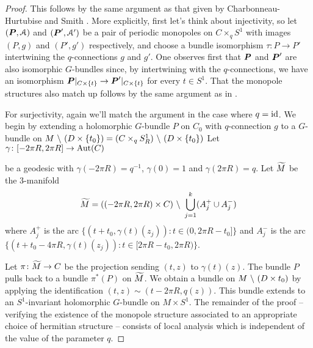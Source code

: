 \documentclass[10pt, oneside]{article}
\begin{document}
\begin{proof}
This follows by the same argument as that given by Charbonneau-Hurtubise \cite{CharbonneauHurtubise} and Smith \cite{Smith}.  More explicitly, first let's think about injectivity, so let $(\boldsymbol{P}, \mathcal{A})$ and $(\boldsymbol{P}', \mathcal{A}')$ be a pair of periodic monopoles on $C \times_q S^1$ with images $(P,g)$ and $(P', g')$ respectively, and choose a bundle isomorphism $\tau \colon P \to P'$ intertwining the $q$-connections $g$ and $g'$.  One observes first that $\boldsymbol{P}$ and $\boldsymbol{P}'$ are also isomorphic $G$-bundles since, by intertwining with the $q$-connections, we have an isomorphism $\boldsymbol{P}|_{C \times \{t\}} \to \boldsymbol{P}'|_{C \times \{t\}}$ for every $t \in S^1$.  That the monopole structures also match up follows by the same argument as in \cite[Proposition 4.7]{CharbonneauHurtubise}.

For surjectivity, again we'll match the argument in the case where $q=\operatorname{id}$.  We begin by extending a holomorphic $G$-bundle $P$ on $C_0$ with $q$-connection $g$ to a $G$-bundle on $M \ \backslash \  (D \times \{t_0\}) = (C \times_q S^1_R) \ \backslash \  (D \times \{t_0\})$  Let $\gamma \colon [-2\pi R,2\pi R] \to \operatorname{Aut}(C)$ 
 

be a geodesic with $\gamma(-2\pi R) = q^{-1}$, $\gamma(0)=1$ and $\gamma(2\pi R) = q$.  Let $\widetilde{M}$ be the 3-manifold
\[\widetilde{M} = ((-2\pi R, 2\pi R) \times C) \ \backslash \  \bigcup_{j=1}^k (A^+_j \cup A^-_j)\]
where $A^+_j$ is the arc $\{(t+ t_0,\gamma(t)(z_j)) \colon t \in (0, 2\pi R - t_0]\}$ and $A^-_j$ is the arc $\{(t + t_0 - 4 \pi R,\gamma(t)(z_j)) \colon t \in [2\pi R-t_0, 2 \pi R)\}$.

Let $\pi \colon \widetilde{M} \to C$ be the projection sending $(t,z)$ to $\gamma(t)(z)$.  The bundle $P$ pulls back to a bundle $\pi^*(P)$ on $\widetilde{M}$.  We obtain a bundle on $M \ \backslash \  (D \times t_0)$ by applying the identification $(t,z) \sim (t - 2 \pi R, q(z))$.  This bundle extends to an $S^1$-invariant holomorphic $G$-bundle on $M \times S^1$.  The remainder of the proof -- verifying the existence of the monopole structure associated to an appropriate choice of hermitian structure -- consists of local analysis which is independent of the value of the parameter $q$. 


\end{proof}
\end{document}
